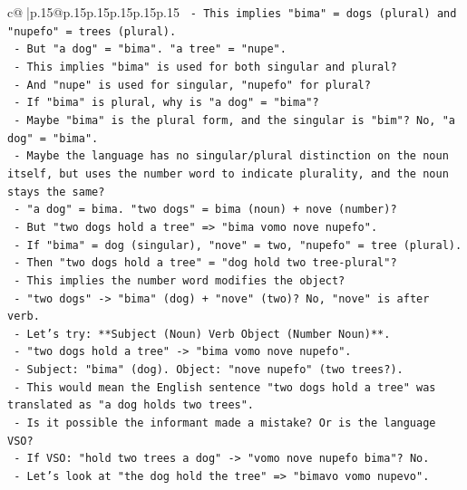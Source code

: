 \documentclass{article}
\begin{document}
{\begin{supertabular}{c@{$\;$}|p{.15\linewidth}@{}p{.15\linewidth}p{.15\linewidth}p{.15\linewidth}p{.15\linewidth}p{.15\linewidth}}
{{{\texttt{           {-} This implies "bima" = dogs (plural) and "nupefo" = trees (plural).} \\
\texttt{           {-} But "a dog" = "bima". "a tree" = "nupe".} \\
\texttt{           {-} This implies "bima" is used for both singular and plural?} \\
\texttt{           {-} And "nupe" is used for singular, "nupefo" for plural?} \\
\texttt{           {-} If "bima" is plural, why is "a dog" = "bima"?} \\
\texttt{           {-} Maybe "bima" is the plural form, and the singular is "bim"? No, "a dog" = "bima".} \\
\texttt{           {-} Maybe the language has no singular/plural distinction on the noun itself, but uses the number word to indicate plurality, and the noun stays the same?} \\
\texttt{           {-} "a dog" = bima. "two dogs" = bima (noun) + nove (number)?} \\
\texttt{           {-} But "two dogs hold a tree" => "bima vomo nove nupefo".} \\
\texttt{           {-} If "bima" = dog (singular), "nove" = two, "nupefo" = tree (plural).} \\
\texttt{           {-} Then "two dogs hold a tree" = "dog hold two tree{-}plural"?} \\
\texttt{           {-} This implies the number word modifies the object?} \\
\texttt{           {-} "two dogs" {-}> "bima" (dog) + "nove" (two)? No, "nove" is after verb.} \\
\texttt{           {-} Let's try: **Subject (Noun) Verb Object (Number Noun)**.} \\
\texttt{           {-} "two dogs hold a tree" {-}> "bima vomo nove nupefo".} \\
\texttt{           {-} Subject: "bima" (dog). Object: "nove nupefo" (two trees?).} \\
\texttt{           {-} This would mean the English sentence "two dogs hold a tree" was translated as "a dog holds two trees".} \\
\texttt{           {-} Is it possible the informant made a mistake? Or is the language VSO?} \\
\texttt{           {-} If VSO: "hold two trees a dog" {-}> "vomo nove nupefo bima"? No.} \\
\texttt{           {-} Let's look at "the dog hold the tree" => "bimavo vomo nupevo".} \\
}}}
\end{supertabular}}
\end{document}
